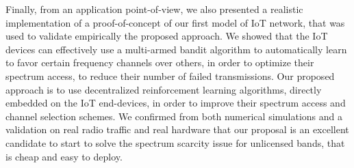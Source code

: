 Finally, from an application point-of-view, we also presented a realistic implementation of a proof-of-concept of our first model of IoT network, that was used to validate empirically the proposed approach.
We showed that the IoT devices can effectively use a multi-armed bandit algorithm to automatically learn to favor certain frequency channels over others, in order to optimize their spectrum access, to reduce their number of failed transmissions.
%
Our proposed approach is to use decentralized reinforcement learning algorithms, directly embedded on the IoT end-devices, in order to improve their spectrum access and channel selection schemes.
We confirmed from both numerical simulations and a validation on real radio traffic and real hardware that our proposal is an excellent candidate to start to solve the spectrum scarcity issue for unlicensed bands, that is cheap and easy to deploy.




